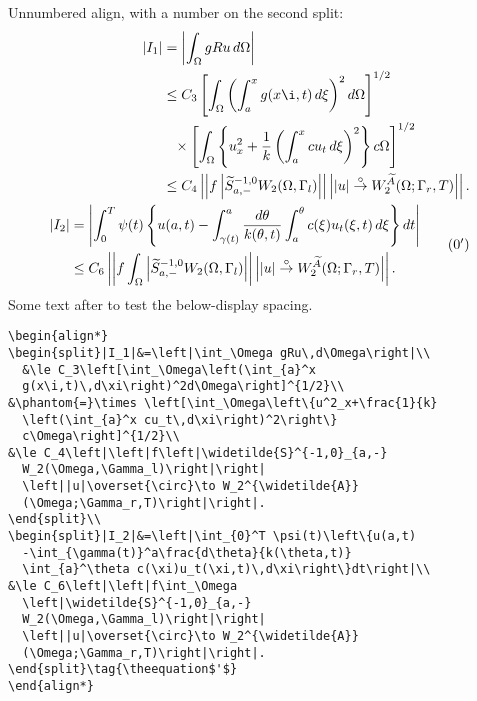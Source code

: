 \documentclass[draft]{amsart}
\newcommand{\ntt}{\normalfont\ttfamily}
\newcommand{\env}[1]{{\protect\ntt#1}}
\theoremstyle{definition}
\theoremstyle{remark}
\begin{document}

\newpage
Unnumbered \env{align}, with a number on the second \env{split}:
\begin{align*}
\begin{split}|I_1|&=\left|\int_\Omega gRu\,d\Omega\right|\\
  &\le C_3\left[\int_\Omega\left(\int_{a}^x
  g(x\i,t)\,d\xi\right)^2d\Omega\right]^{1/2}\\
&\phantom{=}\times \left[\int_\Omega\left\{u^2_x+\frac{1}{k}
  \left(\int_{a}^x cu_t\,d\xi\right)^2\right\}
  c\Omega\right]^{1/2}\\
&\le C_4\left|\left|f\left|\widetilde{S}^{-1,0}_{a,-}
  W_2(\Omega,\Gamma_l)\right|\right|
  \left||u|\overset{\circ}\to W_2^{\widetilde{A}}
  (\Omega;\Gamma_r,T)\right|\right|.
\end{split}\\
\begin{split}|I_2|&=\left|\int_{0}^T \psi(t)\left\{u(a,t)
  -\int_{\gamma(t)}^a\frac{d\theta}{k(\theta,t)}
  \int_{a}^\theta c(\xi)u_t(\xi,t)\,d\xi\right\}dt\right|\\
&\le C_6\left|\left|f\int_\Omega
  \left|\widetilde{S}^{-1,0}_{a,-}
  W_2(\Omega,\Gamma_l)\right|\right|
  \left||u|\overset{\circ}\to W_2^{\widetilde{A}}
  (\Omega;\Gamma_r,T)\right|\right|.
\end{split}\tag{\theequation$'$}
\end{align*}
Some text after to test the below-display spacing.

\begin{verbatim}
\begin{align*}
\begin{split}|I_1|&=\left|\int_\Omega gRu\,d\Omega\right|\\
  &\le C_3\left[\int_\Omega\left(\int_{a}^x
  g(x\i,t)\,d\xi\right)^2d\Omega\right]^{1/2}\\
&\phantom{=}\times \left[\int_\Omega\left\{u^2_x+\frac{1}{k}
  \left(\int_{a}^x cu_t\,d\xi\right)^2\right\}
  c\Omega\right]^{1/2}\\
&\le C_4\left|\left|f\left|\widetilde{S}^{-1,0}_{a,-}
  W_2(\Omega,\Gamma_l)\right|\right|
  \left||u|\overset{\circ}\to W_2^{\widetilde{A}}
  (\Omega;\Gamma_r,T)\right|\right|.
\end{split}\\
\begin{split}|I_2|&=\left|\int_{0}^T \psi(t)\left\{u(a,t)
  -\int_{\gamma(t)}^a\frac{d\theta}{k(\theta,t)}
  \int_{a}^\theta c(\xi)u_t(\xi,t)\,d\xi\right\}dt\right|\\
&\le C_6\left|\left|f\int_\Omega
  \left|\widetilde{S}^{-1,0}_{a,-}
  W_2(\Omega,\Gamma_l)\right|\right|
  \left||u|\overset{\circ}\to W_2^{\widetilde{A}}
  (\Omega;\Gamma_r,T)\right|\right|.
\end{split}\tag{\theequation$'$}
\end{align*}
\end{verbatim}
\end{document}
